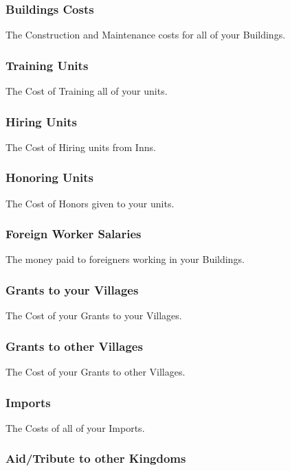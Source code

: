 \subsubsection{Buildings Costs}

The Construction and Maintenance costs for all of your Buildings.

\subsubsection{Training Units}

The Cost of Training all of your units.

\subsubsection{Hiring Units}

The Cost of Hiring units from Inns.

\subsubsection{Honoring Units}

The Cost of Honors given to your units.

\subsubsection{Foreign Worker Salaries}

The money paid to foreigners working in your Buildings.

\subsubsection{Grants to your Villages}

The Cost of your Grants to your Villages.

\subsubsection{Grants to other Villages}

The Cost of your Grants to other Villages.

\subsubsection{Imports}

The Costs of all of your Imports.

\subsubsection{Aid/Tribute to other Kingdoms}

